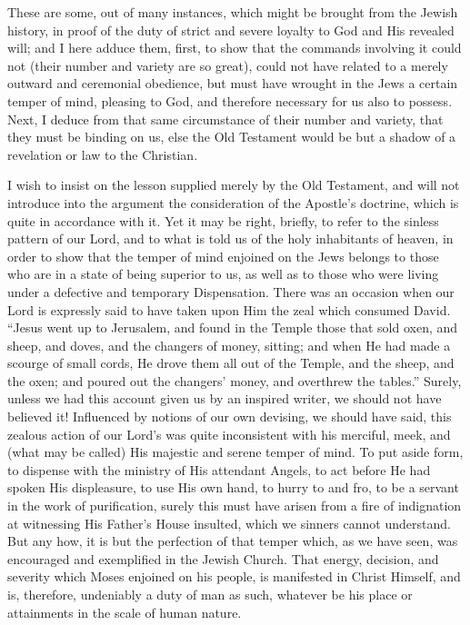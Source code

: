 These are some, out of many instances, which might be brought from
the Jewish history, in proof of the duty of strict and severe loyalty
to God and His revealed will; and I here adduce them, first, to show
that the commands involving it could not (their number and variety are
so great), could not have related to a merely outward and ceremonial
obedience, but must have wrought in the Jews a certain temper of mind,
pleasing to God, and therefore necessary for us also to possess. Next,
I deduce from that same circumstance of their number and variety, that
they must be binding on us, else the Old Testament would be but a
shadow of a revelation or law to the Christian.

I wish to insist on the lesson supplied merely by the Old
Testament, and will not introduce into the argument the consideration
of the Apostle's doctrine, which is quite in accordance with it. Yet
it may be right, briefly, to refer to the sinless pattern of our Lord,
and to what is told us of the holy inhabitants of heaven, in order to
show that the temper of mind enjoined on the Jews belongs to those who
are in a state of being superior to us, as well as to those who were
living under a defective and temporary Dispensation. There was an
occasion when our Lord is expressly said to have taken upon Him the
zeal which consumed David. ``Jesus went up to Jerusalem, and found
in the Temple those that sold oxen, and sheep, and doves, and the
changers of money, sitting; and when He had made a scourge of small
cords, He drove them all out of the Temple, and the sheep, and the
oxen; and poured out the changers' money, and overthrew the
tables.'' Surely, unless we had this account given us by an
inspired writer, we should not have believed it! Influenced by notions
of our own devising, we should have said, this zealous action of our
Lord's was quite inconsistent with his merciful, meek, and (what may
be called) His majestic and serene temper of mind. To put aside form,
to dispense with the ministry of His attendant Angels, to act before
He had spoken His displeasure, to use His own hand, to hurry to and
fro, to be a servant in the work of purification, surely this must
have arisen from a fire of indignation at witnessing His Father's
House insulted, which we sinners cannot understand. But any how, it is
but the perfection of that temper which, as we have seen, was
encouraged and exemplified in the Jewish Church. That energy,
decision, and severity which Moses enjoined on his people, is
manifested in Christ Himself, and is, therefore, undeniably a duty of
man as such, whatever be his place or attainments in the scale of
human nature.

